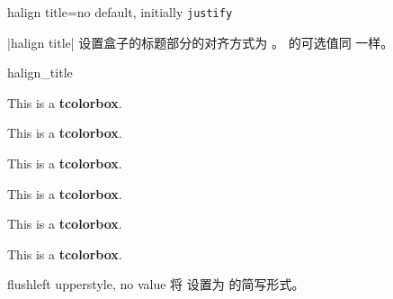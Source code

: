 \begin{docTcbKey}[][doc new=2022-10-30]{halign title}{=}{no default, initially \texttt{justify}}
  
  |halign title| 设置盒子的标题部分的对齐方式为 。
   的可选值同  一样。
  
  \begin{exdispExample}{halign_title}
  \begin{tcbraster}[raster columns=3,fonttitle=\bfseries,
  colback=red!5!white,colframe=red!75!black]
  
  \begin{tcolorbox}[adjusted title=flush center,halign title=flush center]
    This is a \textbf{tcolorbox}.
  \end{tcolorbox}
  \begin{tcolorbox}[adjusted title=flush left,halign title=flush left]
    This is a \textbf{tcolorbox}.
  \end{tcolorbox}
  \begin{tcolorbox}[adjusted title=flush right,halign title=flush right]
    This is a \textbf{tcolorbox}.
  \end{tcolorbox}
  \begin{tcolorbox}[adjusted title=center,halign title=center]
    This is a \textbf{tcolorbox}.
  \end{tcolorbox}
  \begin{tcolorbox}[adjusted title=left,halign title=left]
    This is a \textbf{tcolorbox}.
  \end{tcolorbox}
  \begin{tcolorbox}[adjusted title=right,halign title=right]
    This is a \textbf{tcolorbox}.
  \end{tcolorbox}
  
  \end{tcbraster}
  \end{exdispExample}
  \end{docTcbKey}





\begin{docTcbKey}[][doc updated=2015-05-07]{flushleft upper}{}{style, no value}
  将  设置为  的简写形式。
  \end{docTcbKey}
  
